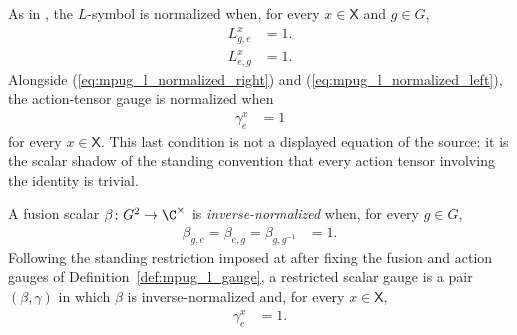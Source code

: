 \begin{definition}
    \label{def:mpug_l_normalized}
    \leanok
    As in \cite{FrancoRubio2025MPUGauging}, the $L$-symbol is normalized when,
    for every $x\in\mathsf X$ and $g\in G$,
    \begin{align}
        L^x_{g,e} & =1.
        \label{eq:mpug_l_normalized_right}
    \end{align}
    \begin{align}
        L^x_{e,g} & =1.
        \label{eq:mpug_l_normalized_left}
    \end{align}
    Alongside (\ref{eq:mpug_l_normalized_right}) and
    (\ref{eq:mpug_l_normalized_left}), the action-tensor gauge is normalized
    when
    \begin{align}
        \gamma^x_e & =1
        \label{eq:mpug_action_gauge_normalized}
    \end{align}
    for every $x\in\mathsf X$. This last condition is not a displayed
    equation of the source: it is the scalar shadow of the standing
    convention that every action tensor involving the identity is trivial.
\end{definition}

\begin{definition}
    \label{def:mpug_restricted_scalar_gauge}
    \leanok
    A fusion scalar $\beta\colon G^2\to\C^\times$ is
    \emph{inverse-normalized} when, for every $g\in G$,
    \begin{align}
        \beta_{g,e}=\beta_{e,g}=\beta_{g,g^{-1}}
         & =1.
        \label{eq:mpug_restricted_fusion_gauge}
    \end{align}
    Following the standing restriction imposed at
    \cite[lines~2050--2054]{FrancoRubio2025MPUGauging} after fixing the
    fusion and action gauges of Definition~\ref{def:mpug_l_gauge}, a
    restricted scalar gauge is a pair $(\beta,\gamma)$ in which $\beta$ is
    inverse-normalized and, for every $x\in\mathsf X$,
    \begin{align}
        \gamma^x_e & =1.
        \label{eq:mpug_restricted_action_gauge}
    \end{align}
\end{definition}

